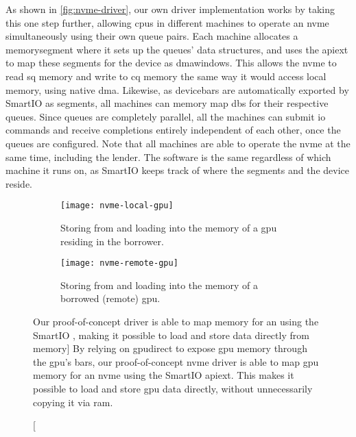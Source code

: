 As shown in \cref{fig:nvme-driver}, our own driver implementation works by taking this one step further, allowing \glspl{cpu} in different machines to operate an \gls{nvme} simultaneously using their own queue pairs.
%
Each machine allocates a \gls{memorysegment} where it sets up the queues' data structures, and uses the \gls{apiext} to map these segments for the device as \glspl{dmawindow}.
%
This allows the \gls{nvme} to read \gls{sq} memory and write to \gls{cq} memory the same way it would access local memory, using native \gls{dma}.
%
Likewise, as \glspl{devicebar} are automatically exported by SmartIO as \glspl{segment}, all machines can memory map \glspl{db} for their respective queues.
%
Since queues are completely parallel, all the machines can submit \gls{io} commands and receive completions entirely independent of each other, once the queues are configured.
%
Note that all machines are able to operate the \gls{nvme} at the same time, including the \gls{lender}.
%
The software is the same regardless of which machine it runs on, as SmartIO keeps track of where the \glspl{segment} and the device reside.


\begin{figure}
    \centering
    \begin{subfigure}{\linewidth}
        \centering
        \texttt{[image: nvme-local-gpu]}
        \caption{Storing from and loading into the memory of a \gls{gpu} residing in the \gls{borrower}.}
        \label{fig:nvme-local-gpu}
    \end{subfigure}
    \par\vspace{5mm}
    \begin{subfigure}{\linewidth}
        \centering
        \texttt{[image: nvme-remote-gpu]}
        \caption{Storing from and loading into the memory of a borrowed (remote) \gls{gpu}.}
        \label{fig:nvme-remote-gpu}
    \end{subfigure}
    \caption
    [Our proof-of-concept  driver is able to map  memory for an  using the SmartIO , making it possible to load and store data directly from  memory]
    {By relying on \gls{gpudirect} to expose \gls{gpu} memory through the \gls{gpu}'s \glspl{bar}, our proof-of-concept \gls{nvme} driver is able to map \gls{gpu} memory for an \gls{nvme} using the SmartIO \gls{apiext}. This makes it possible to load and store \gls{gpu} data directly, without unnecessarily copying it via \gls{ram}.}
    \label{fig:nvme-gpu}
\end{figure}


